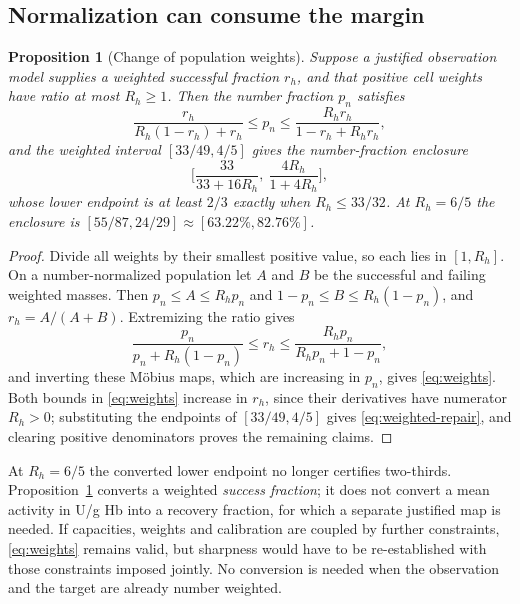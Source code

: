 \documentclass[11pt]{article}
\newtheorem{proposition}[theorem]{Proposition}
\theoremstyle{definition}
\begin{document}
\subsection{Normalization can consume the margin}
\begin{proposition}[Change of population weights]\label{prop:weights}
Suppose a justified observation model supplies a weighted successful fraction
$r_h$, and that positive cell weights have ratio at most $R_h\ge1$. Then the
number fraction $p_n$ satisfies
\begin{equation}\label{eq:weights}
  \frac{r_h}{R_h(1-r_h)+r_h}\le p_n\le\frac{R_hr_h}{1-r_h+R_hr_h},
\end{equation}
and the weighted interval $[33/49,4/5]$ gives the number-fraction enclosure
\begin{equation}\label{eq:weighted-repair}
  \Big[\frac{33}{33+16R_h},\ \frac{4R_h}{1+4R_h}\Big],
\end{equation}
whose lower endpoint is at least $2/3$ exactly when $R_h\le33/32$. At
$R_h=6/5$ the enclosure is $[55/87,24/29]\approx[63.22\%,82.76\%]$.
\end{proposition}
\begin{proof}
Divide all weights by their smallest positive value, so each lies in
$[1,R_h]$. On a number-normalized population let $A$ and $B$ be the successful
and failing weighted masses. Then $p_n\le A\le R_hp_n$ and
$1-p_n\le B\le R_h(1-p_n)$, and $r_h=A/(A+B)$. Extremizing the ratio gives
\[
  \frac{p_n}{p_n+R_h(1-p_n)}\le r_h\le\frac{R_hp_n}{R_hp_n+1-p_n},
\]
and inverting these Möbius maps, which are increasing in $p_n$, gives
\eqref{eq:weights}. Both bounds in \eqref{eq:weights} increase in $r_h$, since
their derivatives have numerator $R_h>0$; substituting the endpoints of
$[33/49,4/5]$ gives \eqref{eq:weighted-repair}, and clearing positive
denominators proves the remaining claims.
\end{proof}

At $R_h=6/5$ the converted lower endpoint no longer certifies two-thirds.
Proposition~\ref{prop:weights} converts a weighted \emph{success fraction};
it does not convert a mean activity in U/g Hb into a recovery fraction, for
which a separate justified map is needed. If capacities, weights and
calibration are coupled by further constraints, \eqref{eq:weights} remains
valid, but sharpness would have to be re-established with those constraints
imposed jointly. No conversion is needed when the observation and the target
are already number weighted.
\end{document}
